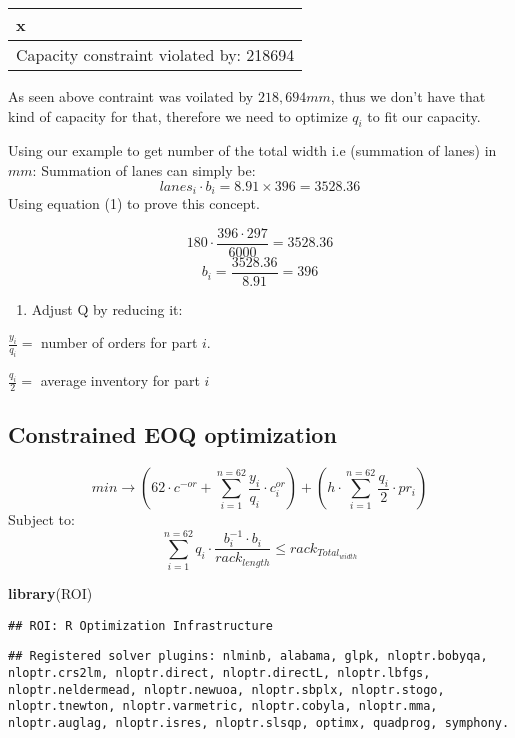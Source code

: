 \documentclass[
]{article}
\newenvironment{Shaded}{\begin{snugshade}}{\end{snugshade}}
\newcommand{\KeywordTok}[1]{\textcolor[rgb]{0.13,0.29,0.53}{\textbf{#1}}}
\newcommand{\NormalTok}[1]{#1}
\providecommand{\tightlist}{%
  \setlength{\itemsep}{0pt}\setlength{\parskip}{0pt}}
\begin{document}
\begin{longtable}[]{@{}l@{}}
\toprule
x\tabularnewline
\midrule
\endhead
Capacity constraint violated by: 218694\tabularnewline
\bottomrule
\end{longtable}

As seen above contraint was voilated by \(218,694 mm\), thus we don't
have that kind of capacity for that, therefore we need to optimize
\(q_i\) to fit our capacity.

Using our example to get number of the total width i.e (summation of
lanes) in \(mm\): Summation of lanes can simply be:
\[lanes_i \cdot b_i= 8.91 \times 396=3528.36\] Using equation (1) to
prove this concept.

\[180 \cdot \frac {396 \cdot 297}{6000}=3528.36 \]
\[ b_i= \frac {3528.36}{8.91}=396\]

\begin{enumerate}
\def\labelenumi{(\Alph{enumi})}
\setcounter{enumi}{3}
\tightlist
\item
  Adjust Q by reducing it:
\end{enumerate}

\(\frac {y_i}{q_i}=\) number of orders for part \(i\).

\(\frac {q_i}{2}=\) average inventory for part \(i\)

\hypertarget{constrained-eoq-optimization}{%
\subsection{Constrained EOQ
optimization}\label{constrained-eoq-optimization}}

\[ min \rightarrow (62 \cdot c^{-or} + \sum_{i=1}^{n=62} \frac {y_i}{q_i} \cdot c_i^{or}) + (h \cdot \sum_{i=1}^{n=62} \frac {q_i}{2}\cdot pr_i ) \]
Subject to:
\[\sum_{i=1}^{n=62} q_i \cdot \frac {b_i^{-1} \cdot b_i}{rack_{length}} \le rack_{Total_{width}} \]

\begin{Shaded}
\begin{Highlighting}[]
\KeywordTok{library}\NormalTok{(ROI)}
\end{Highlighting}
\end{Shaded}

\begin{verbatim}
## ROI: R Optimization Infrastructure
\end{verbatim}

\begin{verbatim}
## Registered solver plugins: nlminb, alabama, glpk, nloptr.bobyqa, nloptr.crs2lm, nloptr.direct, nloptr.directL, nloptr.lbfgs, nloptr.neldermead, nloptr.newuoa, nloptr.sbplx, nloptr.stogo, nloptr.tnewton, nloptr.varmetric, nloptr.cobyla, nloptr.mma, nloptr.auglag, nloptr.isres, nloptr.slsqp, optimx, quadprog, symphony.
\end{verbatim}
\end{document}
